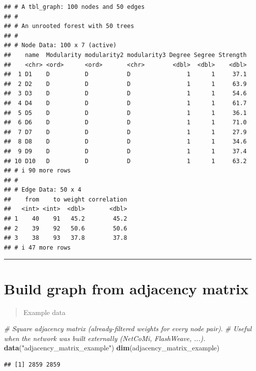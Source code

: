 \documentclass[
]{book}
\newenvironment{Shaded}{\begin{snugshade}}{\end{snugshade}}
\newcommand{\CommentTok}[1]{\textcolor[rgb]{0.56,0.35,0.01}{\textit{#1}}}
\newcommand{\FunctionTok}[1]{\textcolor[rgb]{0.13,0.29,0.53}{\textbf{#1}}}
\newcommand{\NormalTok}[1]{#1}
\newcommand{\StringTok}[1]{\textcolor[rgb]{0.31,0.60,0.02}{#1}}
\begin{document}
\begin{verbatim}
## # A tbl_graph: 100 nodes and 50 edges
## #
## # An unrooted forest with 50 trees
## #
## # Node Data: 100 x 7 (active)
##    name  Modularity modularity2 modularity3 Degree Segree Strength
##    <chr> <ord>      <ord>       <chr>        <dbl>  <dbl>    <dbl>
##  1 D1    D          D           D                1      1     37.1
##  2 D2    D          D           D                1      1     63.9
##  3 D3    D          D           D                1      1     54.6
##  4 D4    D          D           D                1      1     61.7
##  5 D5    D          D           D                1      1     36.1
##  6 D6    D          D           D                1      1     71.0
##  7 D7    D          D           D                1      1     27.9
##  8 D8    D          D           D                1      1     34.6
##  9 D9    D          D           D                1      1     37.4
## 10 D10   D          D           D                1      1     63.2
## # i 90 more rows
## #
## # Edge Data: 50 x 4
##    from    to weight correlation
##   <int> <int>  <dbl>       <dbl>
## 1    40    91   45.2        45.2
## 2    39    92   50.6        50.6
## 3    38    93   37.8        37.8
## # i 47 more rows
\end{verbatim}

\begin{center}\rule{0.5\linewidth}{0.5pt}\end{center}

\section{Build graph from adjacency matrix}\label{build-graph-from-adjacency-matrix}

\begin{quote}
Example data
\end{quote}

\begin{Shaded}
\begin{Highlighting}[]
\CommentTok{\# Square adjacency matrix (already{-}filtered weights for every node pair).}
\CommentTok{\# Useful when the network was built externally (NetCoMi, FlashWeave, ...).}
\FunctionTok{data}\NormalTok{(}\StringTok{"adjacency\_matrix\_example"}\NormalTok{)}
\FunctionTok{dim}\NormalTok{(adjacency\_matrix\_example)}
\end{Highlighting}
\end{Shaded}

\begin{verbatim}
## [1] 2859 2859
\end{verbatim}
\end{document}
